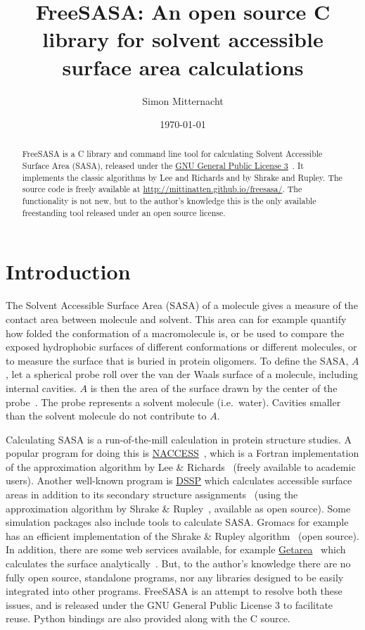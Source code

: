 \documentclass[a4paper,11pt]{article}
\author{Simon Mitternacht}
\date{\today}
\title{FreeSASA: An open source C library for solvent accessible surface
  area calculations
}
\begin{document}
\maketitle

\begin{abstract}
FreeSASA is a C library and command line tool for calculating
Solvent Accessible Surface Area (SASA), released under the
\href{http://www.gnu.org/licenses/gpl.html}{GNU General Public License
  3}~\cite{GPL}. It implements the classic algorithms by Lee and
Richards and by Shrake and Rupley. The source code is freely available
at \url{http://mittinatten.github.io/freesasa/}. The functionality is
not new, but to the author's knowledge this is the only available
freestanding tool released under an open source license.
\end{abstract}

\section{Introduction}
The Solvent Accessible Surface Area (SASA) of a molecule gives a
measure of the contact area between molecule and solvent. This area
can for example quantify how folded the conformation of a
macromolecule is, or be used to compare the exposed hydrophobic
surfaces of different conformations or different molecules, or to
measure the surface that is buried in protein oligomers. To define the
SASA, $A$, let a spherical probe roll over the van der Waals surface of
a molecule, including internal cavities. $A$ is then the area of the
surface drawn by the center of the probe~\cite{LnR}. The probe
represents a solvent molecule (i.e.\ water). Cavities smaller than the
solvent molecule do not contribute to $A$.

Calculating SASA is a run-of-the-mill calculation in protein structure
studies. A popular program for doing this is
\href{http://www.bioinf.manchester.ac.uk/naccess/}{NACCESS}~\cite{NACCESS},
which is a Fortran implementation of the approximation algorithm by
Lee \& Richards~\cite{LnR} (freely available to academic
users). Another well-known program is
\href{http://swift.cmbi.ru.nl/gv/dssp/}{DSSP} which calculates
accessible surface areas in addition to its secondary structure
assignments~\cite{DSSP} (using the approximation algorithm by Shrake
\& Rupley~\cite{SnR}, available as open source). Some simulation
packages also include tools to calculate SASA. Gromacs for example has
an efficient implementation of the Shrake \& Rupley
algorithm~\cite{DCLM} (open source). In addition, there are some web
services available, for example
\href{http://curie.utmb.edu/getarea.html}{Getarea}~\cite{GetAreaURL}
which calculates the surface analytically~\cite{Getarea}. But, to the
author's knowledge there are no fully open source, standalone
programs, nor any libraries designed to be easily integrated into
other programs. FreeSASA is an attempt to resolve both these issues,
and is released under the GNU General Public License 3 to facilitate
reuse. Python bindings are also provided along with the C source.
\end{document}
